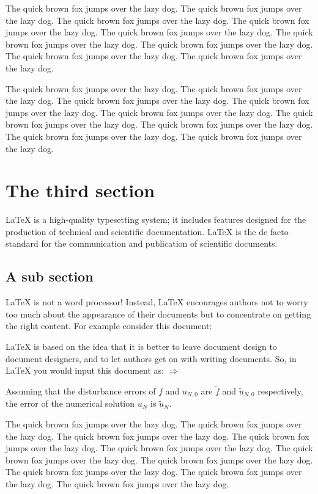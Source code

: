 \documentclass[openany,twoside,12pt]{book}
\theoremstyle{plain}
\numberwithin{equation}{chapter}
\numberwithin{figure}{chapter}
\numberwithin{table}{chapter}
\begin{document}
The quick brown fox jumps over the lazy dog. The quick brown fox jumps over the lazy dog. The quick brown fox jumps over the lazy dog. The quick brown fox jumps over the lazy dog. The quick brown fox jumps over the lazy dog. The quick brown fox jumps over the lazy dog. The quick brown fox jumps over the lazy dog. The quick brown fox jumps over the lazy dog. The quick brown fox jumps over the lazy dog.


The quick brown fox jumps over the lazy dog. The quick brown fox jumps over the lazy dog. The quick brown fox jumps over the lazy dog. The quick brown fox jumps over the lazy dog. The quick brown fox jumps over the lazy dog. The quick brown fox jumps over the lazy dog. The quick brown fox jumps over the lazy dog. The quick brown fox jumps over the lazy dog. The quick brown fox jumps over the lazy dog.

\section{The third section}
LaTeX is a high-quality typesetting system; it includes features designed for the production of technical and scientific documentation. LaTeX is the de facto standard for the communication and publication of scientific documents.

\subsection{A sub section}
LaTeX is not a word processor! Instead, LaTeX encourages authors not to worry too much about the appearance of their documents but to concentrate on getting the right content. For example consider this document:

LaTeX is based on the idea that it is better to leave document design to document designers, and to let authors get on with writing documents. So, in LaTeX you would input this document as:
$ \Rightarrow $

Assuming that the disturbance errors of $f$ and $u_{N,0}$ are $\tilde{f}$ and $\tilde{u}_{N,0}$ respectively, the error of the numerical solution $u_N$ is $\tilde{u}_N$.


The quick brown fox jumps over the lazy dog. The quick brown fox jumps over the lazy dog. The quick brown fox jumps over the lazy dog. The quick brown fox jumps over the lazy dog. The quick brown fox jumps over the lazy dog. The quick brown fox jumps over the lazy dog. The quick brown fox jumps over the lazy dog. The quick brown fox jumps over the lazy dog. The quick brown fox jumps over the lazy dog. The quick brown fox jumps over the lazy dog.
\end{document}
